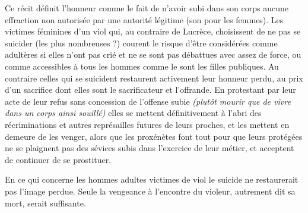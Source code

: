  Ce récit définit l'honneur comme le fait de n'avoir subi dans son corps aucune effraction non autorisée par une autorité légitime (son  pour les femmes). Les victimes féminines d'un viol qui, au contraire de Lucrèce, choisissent de ne pas se suicider (les plus nombreuses ?) courent le risque d'être considérées comme adultères si elles n'ont pas crié et ne se sont pas débattues avec assez de force, ou comme accessibles à tous les hommes comme le sont les filles publiques. Au contraire celles qui se suicident restaurent activement leur honneur perdu, au prix d'un sacrifice dont elles sont le sacrificateur et l'offrande. En protestant par leur acte de leur refus sans concession de l'offense subie {\emph{(plutôt mourir que de vivre dans un corps ainsi souillé)}} elles se mettent définitivement à l'abri des récriminations et autres représailles futures de leurs proches, et les mettent en demeure de les venger, alors que les proxénètes font tout pour que leurs protégées ne se plaignent pas des sévices subis dans l'exercice de leur métier, et acceptent de continuer de se prostituer. 
 
En ce qui concerne les hommes adultes victimes de viol le suicide ne restaurerait pas l'image perdue. Seule la vengeance à l'encontre du violeur, autrement dit sa mort, serait suffisante. 


